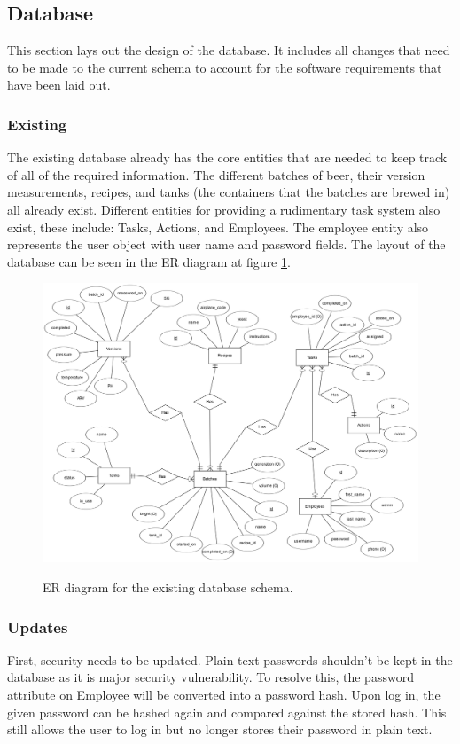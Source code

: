 \documentclass[draftclsnofoot,onecolumn,journal,letterpaper,compsoc,10pt]{IEEEtran}
\begin{document}
    \subsection{Database}
    
    This section lays out the design of the database.  It includes all changes that need to be made to the current schema to account for the software requirements that have been laid out.
    
        \subsubsection{Existing}
        The existing database already has the core entities that are needed to keep track of all of the required information.  The different batches of beer, their version measurements, recipes, and tanks (the containers that the batches are brewed in) all already exist.  Different entities for providing a rudimentary task system also exist, these include: Tasks, Actions, and Employees.  The employee entity also represents the user object with user name and password fields.  The layout of the database can be seen in the ER diagram at figure \ref{erd}.
        
        \begin{figure}
            \centering
            \caption{ER diagram for the existing database schema.}
            \includegraphics[angle=90,origin=c,width=\textwidth,keepaspectratio]{./diagrams/erdplus-diagram.png}
            \label{erd}
        \end{figure}
    
        \subsubsection{Updates}
        First, security needs to be updated.  Plain text passwords shouldn't be kept in the database as it is major security vulnerability. To resolve this, the password attribute on Employee will be converted into a password hash.  Upon log in, the given password can be hashed again and compared against the stored hash.  This still allows the user to log in but no longer stores their password in plain text.
        
\end{document}
